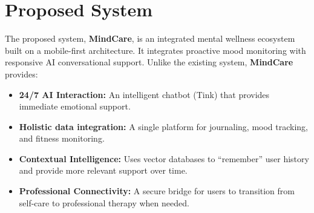 \documentclass[a4paper,12pt]{report}
\begin{document}
\section{Proposed System}
The proposed system, \textbf{MindCare}, is an integrated mental wellness ecosystem built on a mobile-first architecture. It integrates proactive mood monitoring with responsive AI conversational support. Unlike the existing system, \textbf{MindCare} provides:
\begin{itemize}
    \item \textbf{24/7 AI Interaction:} An intelligent chatbot (Tink) that provides immediate emotional support.
    \item \textbf{Holistic data integration:} A single platform for journaling, mood tracking, and fitness monitoring.
    \item \textbf{Contextual Intelligence:} Uses vector databases to ``remember'' user history and provide more relevant support over time.
    \item \textbf{Professional Connectivity:} A secure bridge for users to transition from self-care to professional therapy when needed.
\end{itemize}
\end{document}
